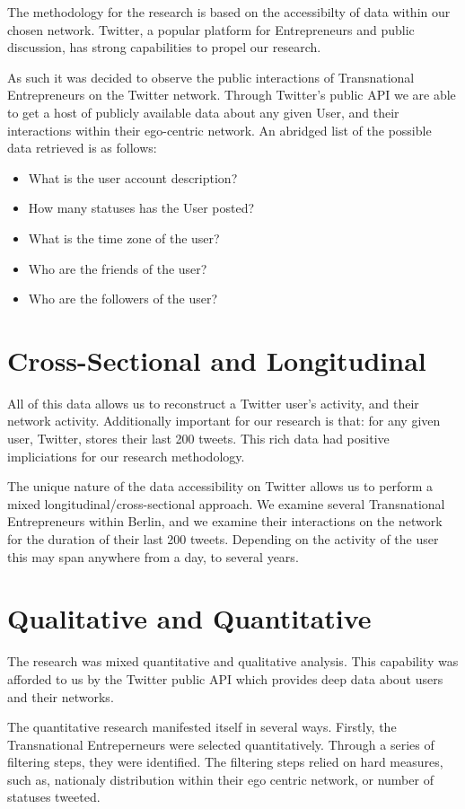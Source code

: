 The methodology for the research is based on the accessibilty of data
within our chosen network. Twitter, a popular platform for
Entrepreneurs and public discussion, has strong capabilities to propel
our research.

As such it was decided to observe the public interactions of
Transnational Entrepreneurs on the Twitter network. Through Twitter's
public API we are able to get a host of publicly available data about
any given User, and their interactions within their ego-centric
network. An abridged list of the possible data retrieved is as follows:

\begin{itemize}
\item What is the user account description?
\item How many statuses has the User posted?
\item What is the time zone of the user?
\item Who are the friends of the user?
\item Who are the followers of the user?
\end{itemize}

\section{Cross-Sectional and Longitudinal}
All of this data allows us to reconstruct a Twitter user's activity,
and their network activity. Additionally important for our research is
that: for any given user, Twitter, stores their last 200 tweets. This
rich data had positive impliciations for our research methodology.

The unique nature of the data accessibility on Twitter allows us to
perform a mixed longitudinal/cross-sectional approach. We examine
several Transnational Entrepreneurs within Berlin, and we examine
their interactions on the network for the duration of their last 200
tweets. Depending on the activity of the user this may span anywhere
from a day, to several years.

\section{Qualitative and Quantitative}
The research was mixed quantitative and qualitative analysis. This
capability was afforded to us by the Twitter public API which provides
deep data about users and their networks.

The quantitative research manifested itself in several ways. Firstly,
the Transnational Entreperneurs were selected quantitatively. Through
a series of filtering steps, they were identified. The filtering steps
relied on hard measures, such as, nationaly distribution within their
ego centric network, or number of statuses tweeted.

